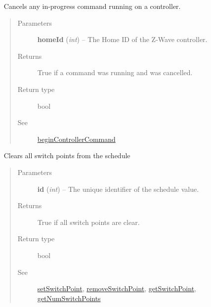 \documentclass[letterpaper,10pt,english]{sphinxmanual}
\begin{document}
\begin{fulllineitems}
\begin{fulllineitems}
\end{fulllineitems}


\begin{fulllineitems}
\label{libopenzwave:libopenzwave.PyManager.cancelControllerCommand}~\label{libopenzwave:cancelcontrollercommand}
Cancels any in-progress command running on a controller.
\begin{quote}\begin{description}
\item[{Parameters}] \leavevmode
\textbf{homeId} (\emph{int}) -- The Home ID of the Z-Wave controller.

\item[{Returns}] \leavevmode
True if a command was running and was cancelled.

\item[{Return type}] \leavevmode
bool

\item[{See}] \leavevmode
{\hyperref[libopenzwave:begincontrollercommand]{beginControllerCommand}}

\end{description}\end{quote}

\end{fulllineitems}


\begin{fulllineitems}
\label{libopenzwave:libopenzwave.PyManager.clearSwitchPoints}~\label{libopenzwave:clearswitchpoints}
Clears all switch points from the schedule
\begin{quote}\begin{description}
\item[{Parameters}] \leavevmode
\textbf{id} (\emph{int}) -- The unique identifier of the schedule value.

\item[{Returns}] \leavevmode
True if all switch points are clear.

\item[{Return type}] \leavevmode
bool

\item[{See}] \leavevmode
{\hyperref[libopenzwave:setswitchpoint]{setSwitchPoint}}, {\hyperref[libopenzwave:removeswitchpoint]{removeSwitchPoint}}, {\hyperref[libopenzwave:getswitchpoint]{getSwitchPoint}}, {\hyperref[libopenzwave:getnumswitchpoints]{getNumSwitchPoints}}


\end{description}
\end{quote}
\end{fulllineitems}
\end{fulllineitems}
\end{document}
